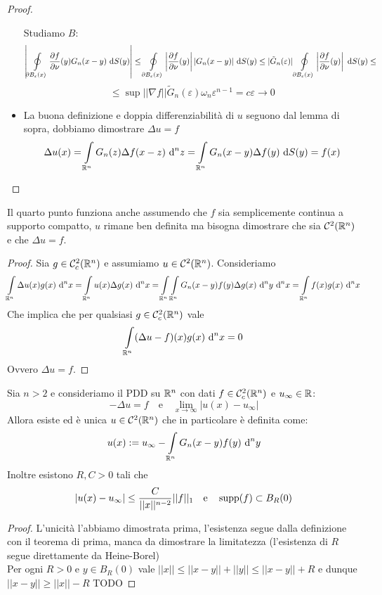 \documentclass{book}
\begin{document}
\begin{proof}
\begin{itemize}
        Studiamo $B$:
        \[\left|\oint\limits_{\partial B_\varepsilon(x)}\frac{\partial f}{\partial \nu}(y)G_n(x-y)\text{ d} S(y)\right|\le \oint\limits_{\partial B_\varepsilon(x)}\left|\frac{\partial f}{\partial \nu}(y)\right||G_n(x-y)|\text{ d} S(y)\le |\tilde{G}_n(\varepsilon)|\oint\limits_{\partial B_\varepsilon(x)}\left|\frac{\partial f}{\partial \nu}(y)\right|\text{ d} S(y)\le\]
        \[\le \sup||\nabla f|| \tilde{G}_n(\varepsilon) \omega_n \varepsilon^{n-1} = c\varepsilon \to 0\]
        \item La buona definizione e doppia differenziabilità di $u$ seguono dal lemma di sopra, dobbiamo dimostrare $\Delta u = f$
        \[\Delta u(x) = \int\limits_{\mathbb{R}^n} G_n(z) \Delta f(x-z)\text{ d}^n z = \int\limits_{\mathbb{R}^n} G_n(x-y)\Delta f(y)\text{ d} S(y) = f(x)\]
    \end{itemize}
\end{proof}

\begin{remark}{}{}
    Il quarto punto funziona anche assumendo che $f$ sia semplicemente continua a supporto compatto, $u$ rimane ben definita ma bisogna dimostrare che sia $\mathcal{C}^2(\mathbb{R}^n)$ e che $\Delta u = f$.
\end{remark}
\begin{proof}
    Sia $g \in \mathcal{C}^2_c(\mathbb{R}^n)$ e assumiamo $u \in \mathcal{C}^2(\mathbb{R}^n)$. Consideriamo
    \[\int\limits_{\mathbb{R}^n}\Delta u (x) g(x) \text{ d}^n x = \int\limits_{\mathbb{R}^n}u(x)\Delta g(x)\text{ d}^n x = \int\limits_{\mathbb{R}^n}\int\limits_{\mathbb{R}^n}G_n(x-y)f(y)\Delta g(x)\text{ d}^n y\text{ d}^n x = \int\limits_{\mathbb{R}^n} f(x)g(x)\text{ d}^n x\]
    Che implica che per qualsiasi $g \in \mathcal{C}^2_c(\mathbb{R}^n)$ vale
    \[\int\limits_{\mathbb{R}^n}(\Delta u - f)(x)g(x)\text{ d}^n x = 0\]
    Ovvero $\Delta u = f$.
\end{proof}

\begin{theorem}{}{}
    Sia $n>2$ e consideriamo il PDD su $\mathbb{R}^n$ con dati $f \in \mathcal{C}^2_c(\mathbb{R}^n)$ e $u_\infty\in\mathbb{R}$:
    \[-\Delta u = f \quad \text{e}\quad \lim_{x\to\infty}|u(x)-u_\infty|\]
    Allora esiste ed è unica $u \in \mathcal{C}^2(\mathbb{R}^n)$ che in particolare è definita come:
    \[u(x):= u_\infty - \int\limits_{\mathbb{R}^n} G_n(x-y)f(y)\text{ d}^n y\]
    Inoltre esistono $R,C>0$ tali che 
    \[|u(x) - u_\infty| \le \frac{C}{||x||^{n-2}}||f||_1 \quad \text{e}\quad \operatorname{supp}(f) \subset B_R(0)\]
\end{theorem}
\begin{proof}
    L'unicità l'abbiamo dimostrata prima, l'esistenza segue dalla definizione con il teorema di prima, manca da dimostrare la limitatezza (l'esistenza di $R$ segue direttamente da Heine-Borel)\\
    Per ogni $R>0$ e $y \in B_R(0)$ vale $||x||\le ||x-y||+||y||\le ||x-y||+R$ e dunque $||x-y||\ge ||x|| - R$
    TODO
\end{proof}
\end{document}
